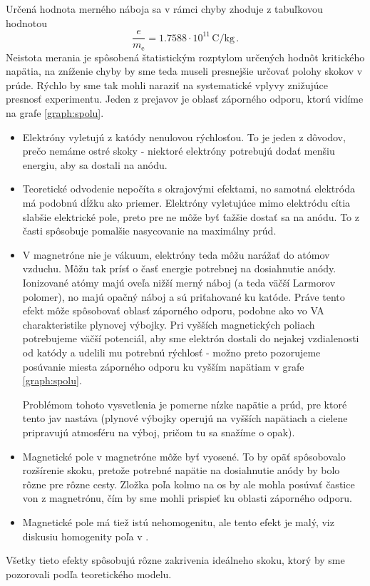 \documentclass[a4paper, 10pt]{article}
\newcommand{\unit}[1]{\ensuremath{\, \mathrm{#1}}}
\newcommand{\di}[1]{\ensuremath{_\mathrm{#1}}}
\begin{document}
Určená hodnota merného náboja sa v rámci chyby zhoduje z tabuľkovou hodnotou
$$
\frac{e}{m\di e} = 1.7588\cdot 10^{11}\unit{C/kg}\,.
$$
Neistota merania je spôsobená štatistickým rozptylom určených hodnôt kritického napätia, na zníženie chyby by sme teda museli presnejšie určovať polohy skokov v prúde. Rýchlo by sme tak mohli naraziť na systematické vplyvy znižujúce presnosť experimentu. Jeden z prejavov je oblasť záporného odporu, ktorú vidíme na grafe \ref{graph:spolu}.
\begin{itemize}
\item Elektróny vyletujú z katódy nenulovou rýchlosťou. To je jeden z dôvodov, prečo nemáme ostré skoky - niektoré elektróny potrebujú dodať menšiu energiu, aby sa dostali na anódu.
\item Teoretické odvodenie nepočíta s okrajovými efektami, no samotná elektróda má podobnú dĺžku ako priemer. Elektróny vyletujúce mimo elektródu cítia slabšie elektrické pole, preto pre ne môže byť ťažšie dostať sa na anódu. To z časti spôsobuje pomalšie nasycovanie na maximálny prúd.
\item V magnetróne nie je vákuum, elektróny teda môžu narážať do atómov vzduchu. Môžu tak prísť o časť energie potrebnej na dosiahnutie anódy. Ionizované atómy majú oveľa nižší merný náboj (a teda väčší Larmorov polomer), no majú opačný náboj a sú priťahované ku katóde. Práve tento efekt môže spôsobovať oblasť záporného odporu, podobne ako vo VA charakteristike plynovej výbojky. Pri vyšších magnetických poliach potrebujeme väčší potenciál, aby sme elektrón dostali do nejakej vzdialenosti od katódy a udelili mu potrebnú rýchlosť - možno preto pozorujeme posúvanie miesta záporného odporu ku vyšším napätiam v grafe \ref{graph:spolu}.

Problémom tohoto vysvetlenia je pomerne nízke napätie a prúd, pre ktoré tento jav nastáva (plynové výbojky operujú na vyšších napätiach a cielene pripravujú atmosféru na výboj, pričom tu sa snažíme o opak).
\item Magnetické pole v magnetróne môže byť vyosené. To by opäť spôsobovalo rozšírenie skoku, pretože potrebné napätie na dosiahnutie anódy by bolo rôzne pre rôzne cesty. Zložka poľa kolmo na os by ale mohla posúvať častice von z magnetrónu, čím by sme mohli prispieť ku oblasti záporného odporu.
\item Magnetické pole má tiež istú nehomogenitu, ale tento efekt je malý, viz diskusiu homogenity poľa v \cite{stud}.
\end{itemize}

Všetky tieto efekty spôsobujú rôzne zakrivenia ideálneho skoku, ktorý by sme pozorovali podľa teoretického modelu.
\end{document}
